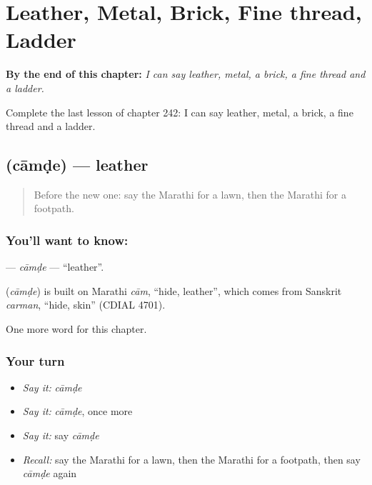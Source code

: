 
\chapter{Leather, Metal, Brick, Fine thread, Ladder}
\label{ch:mr-leather-metal-brick-fine-thread-ladder}

\begin{chapteropening}
\textbf{By the end of this chapter:} \emph{I can say leather, metal, a brick, a fine thread and a ladder.}

Complete the last lesson of chapter 242: I can say leather, metal, a brick, a fine thread and a ladder.
\end{chapteropening}

\section[\texorpdfstring{\mr{चामडे} (cāmḍe)}{चामडे (cāmḍe)}]{ (cāmḍe) — leather}

\label{lesson:MR-C242-camde}



\begin{quote}
Before the new one: say the Marathi for a lawn, then the Marathi for a footpath.
\end{quote}

\subsection*{You'll want to know: }
\textbf{} — \emph{cāmḍe} — \textquotedblleft{}leather\textquotedblright{}.

\begin{cousinweb}
\textbf{} (\emph{cāmḍe}) is built on Marathi \emph{cām}, \textquotedblleft{}hide, leather\textquotedblright{}, which comes from Sanskrit \emph{carman}, \textquotedblleft{}hide, skin\textquotedblright{} (CDIAL 4701).
\end{cousinweb}

\begin{grammarlens}[title={What you've built}]
One more word for this chapter.
\end{grammarlens}

\subsection*{Your turn}
\begin{itemize}
\raggedright
  \item \emph{Say it:} \emph{cāmḍe}
  \item \emph{Say it:} \emph{cāmḍe}, once more
  \item \emph{Say it:} say \emph{cāmḍe}
  \item \emph{Recall:} say the Marathi for a lawn, then the Marathi for a footpath, then say \emph{cāmḍe} again
\end{itemize}

